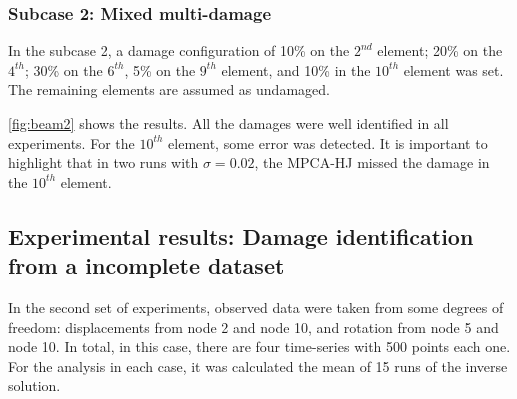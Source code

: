 \subsubsection{Subcase 2: Mixed multi-damage}
\label{sec:mixed}

In the subcase 2, a damage configuration of 10\% on the $2^{nd}$ element; 20\% on the $4^{th}$; 30\% on the $6^{th}$, 5\% on the $9^{th}$ element, and 10\% in the $10^{th}$ element was set. The remaining elements are assumed as undamaged.

\autoref{fig:beam2} shows the results. All the damages were well identified in all experiments. For the $10^{th}$ element, some error was detected. It is important to highlight that in two runs with $\sigma=0.02$, the MPCA-HJ missed the damage in the $10^{th}$ element.


\subsection{Experimental results: Damage identification from a incomplete dataset}

In the second set of experiments, observed data were taken from some degrees of freedom: displacements from node 2 and node 10, and rotation from node 5 and node 10. In total, in this case, there are four time-series with 500 points each one. For the analysis in each case, it was calculated the mean of 15 runs of the inverse solution.

